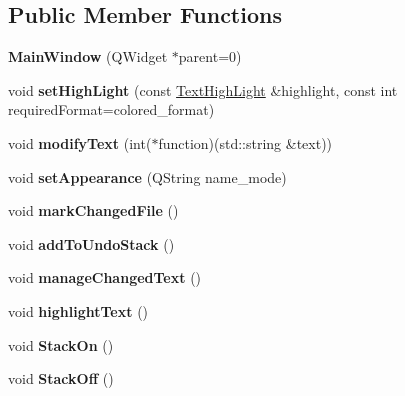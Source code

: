 \subsection*{Public Member Functions}
\begin{DoxyCompactItemize}
\item 
\mbox{\label{class_main_window_a8b244be8b7b7db1b08de2a2acb9409db}} 
{\bfseries Main\+Window} (Q\+Widget $\ast$parent=0)
\item 
\mbox{\label{class_main_window_abf335cb9ff46aa274bc09c331aa5f897}} 
void {\bfseries set\+High\+Light} (const \hyperlink{class_text_high_light}{Text\+High\+Light} \&highlight, const int required\+Format=colored\+\_\+format)
\item 
\mbox{\label{class_main_window_a35ffd96169163c809eb8c11f2dedda28}} 
void {\bfseries modify\+Text} (int($\ast$function)(std\+::string \&text))
\item 
\mbox{\label{class_main_window_a11d121b1058e0266ab2b4b664b3c83a9}} 
void {\bfseries set\+Appearance} (Q\+String name\+\_\+mode)
\item 
\mbox{\label{class_main_window_a506036a835ce0711bb0c10bec4624d3f}} 
void {\bfseries mark\+Changed\+File} ()
\item 
\mbox{\label{class_main_window_af2f81786dd8c7559684623a31fc3a3ff}} 
void {\bfseries add\+To\+Undo\+Stack} ()
\item 
\mbox{\label{class_main_window_a7739077fb423f096a2326f51c9db30e9}} 
void {\bfseries manage\+Changed\+Text} ()
\item 
\mbox{\label{class_main_window_a1cf45333618ad93dd6e0adc944e9aa01}} 
void {\bfseries highlight\+Text} ()
\item 
\mbox{\label{class_main_window_ab5e29151b8338ecabdb9a3d82a48a22f}} 
void {\bfseries Stack\+On} ()
\item 
\mbox{\label{class_main_window_a7776f143d364926bfc7343b4868af4d1}} 
void {\bfseries Stack\+Off} ()

\end{DoxyCompactItemize}
